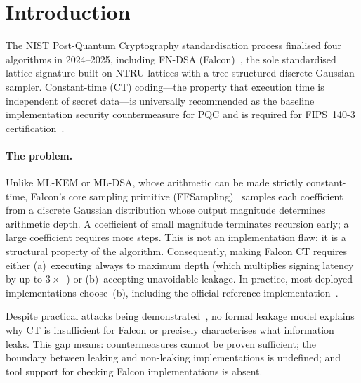 \documentclass[sigconf,anonymous]{acmart}
\begin{document}


\maketitle

\section{Introduction}

The NIST Post-Quantum Cryptography standardisation process finalised four
algorithms in 2024--2025, including FN-DSA (Falcon)~\cite{falcon2020}, the
sole standardised lattice signature built on NTRU lattices with a
tree-structured discrete Gaussian sampler.  Constant-time (CT) coding---the
property that execution time is independent of secret data---is universally
recommended as the baseline implementation security countermeasure for PQC and
is required for FIPS~140-3 certification~\cite{fips1403}.

\paragraph{The problem.}
Unlike ML-KEM or ML-DSA, whose arithmetic can be made strictly constant-time,
Falcon's core sampling primitive (FFSampling)~\cite{prest2015gaussian} samples
each coefficient from a discrete Gaussian distribution whose output magnitude
determines arithmetic depth.  A coefficient of small magnitude terminates
recursion early; a large coefficient requires more steps.  This is not an
implementation flaw: it is a structural property of the algorithm.
Consequently, making Falcon CT requires either (a)~executing always to maximum
depth (which multiplies signing latency by up to $3\times$~\cite{zhao2023ct})
or (b)~accepting unavoidable leakage.  In practice, most deployed
implementations choose~(b), including the official reference
implementation~\cite{falconref}.

Despite practical attacks being demonstrated~\cite{guerreau2022,ravi2023},
no formal leakage model explains why CT is insufficient for Falcon or precisely
characterises what information leaks.  This gap means: countermeasures cannot
be proven sufficient; the boundary between leaking and non-leaking
implementations is undefined; and tool support for checking Falcon
implementations is absent.
\end{document}
